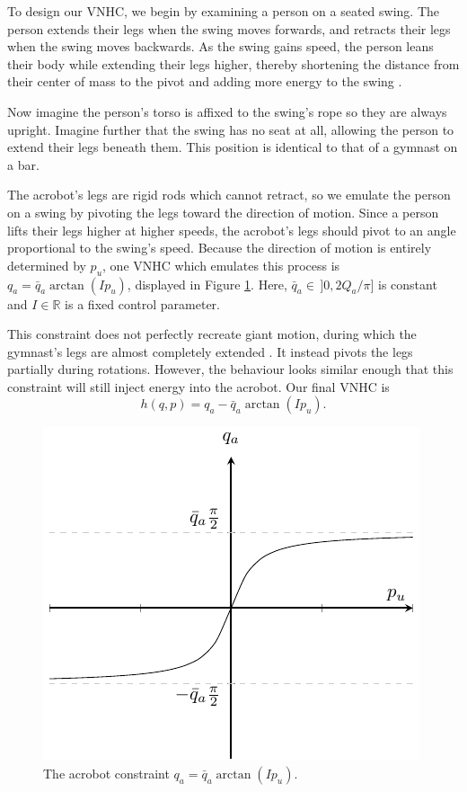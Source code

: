 \documentclass[journal,twoside,web]{ieeecolor}
\newcommand*{\R}{\mathbb{R}}
\begin{document}
To design our VNHC, we begin by examining a person on a
seated swing.
The person extends their legs when the swing moves forwards, and retracts their
legs when the swing moves backwards.
As the swing gains speed, the person leans their body while
extending their legs higher, thereby shortening the distance
from their center of mass to the pivot and adding more energy to the swing
\cite{how_to_pump_a_swing}.

Now imagine the person's torso is affixed to the swing's rope so they are
always upright. 
Imagine further that the swing has no seat at all, allowing the person to extend
their legs beneath them. 
This position is identical to that of a gymnast on a bar.

The acrobot's legs are rigid rods which cannot retract, so we emulate the person
on a swing by pivoting the legs toward the direction of motion. 
Since a person lifts their legs higher at higher speeds, the acrobot's legs should
pivot to an angle proportional to the swing's speed.
Because the direction of motion is entirely determined by \(p_u\), 
one VNHC which emulates this process is \(q_a = \bar{q}_a\arctan( I p_u)\),
displayed in Figure \ref{fig:qa-arctan}.
Here, \(\bar{q}_a \in \, ]0,2 Q_a/\pi]\) is constant and \(I \in \R\) is a fixed
control parameter.

This constraint does not perfectly recreate giant motion, during which
the gymnast's legs are almost completely extended \cite{usagym_giant}.
It instead pivots the legs partially during rotations.
However, the behaviour looks similar enough that this constraint will
still inject energy into the acrobot.
Our final VNHC is
\begin{equation}\label{eqn:acrobot-constraint}
    h(q,p) = q_a - \bar{q}_a \arctan(I p_u)
    .
\end{equation}

\begin{figure}
    \centering
    \includegraphics[width=0.7\linewidth]{qa_arctan.pdf}
    \caption{The acrobot constraint \(q_a = \bar{q}_a \arctan(I p_u)\).}
    \label{fig:qa-arctan}
\end{figure}
\end{document}
